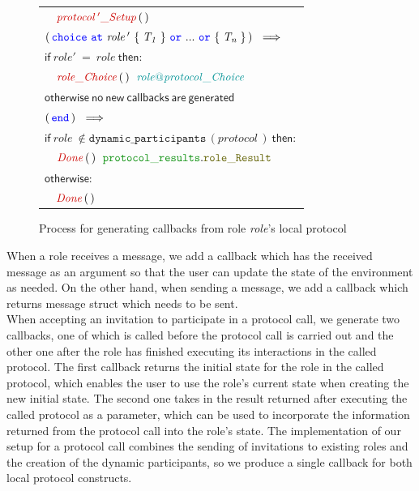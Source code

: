 \documentclass[12pt,twoside]{report}
\begin{document}
\begin{figure}[!h]
\begin{center}
\begin{tabular}{l}
            $\quad \functionname{protocol\,'\_Setup}\,(\,)$\\[15pt]

            $(\,\choice\ \at\ \mathit{role\,'}\ \{\;\mathit{T_1}\;\}\ \scror\ ...\ \scror\ \{\;\mathit{T_n}\;\}\,)\ \implies$\\[6pt]
            $\textsf{if}\ \mathit{role'\ =\ role}\ \textsf{then:}$\\[4pt]
            
            $\quad \functionname{role\_Choice}\,(\,)\;\ \enumtype{\localprotocol{role}{protocol}\_Choice}$\\[10pt]
            $\mathsf{otherwise\ no\ new\ callbacks\ are\ generated}$\\[15pt]

            $(\,\scrend\,)\ \implies$\\[3pt] 
            
            $\mathsf{if}\ \mathit{role}\ \notin \mathtt{dynamic\_participants\,}\mathit{(protocol\,)}\ \mathsf{then}:$\\[4pt]
            
            $\quad \functionname{Done}\,(\,)\;\ \pkgstructaccess{protocol\_results}{role\_Result}$\\[6pt]
            
            $\mathsf{otherwise:}$\\[4pt]
            
            $\quad \functionname{Done}\,(\,)$\\[15pt]

        \end{tabular}
    \end{center}
    \caption{Process for generating callbacks from role \textit{role}'s local protocol}
    \label{callbacks-gen}
\end{figure}

When a role receives a message, we add a callback which has the received message as an argument so that the user can update the state of the environment as needed. On the other hand, when sending a message, we add a callback which returns message struct which needs to be sent.\\

When accepting an invitation to participate in a protocol call, we generate two callbacks, one of which is called before the protocol call is carried out and the other one after the role has finished executing its interactions in the called protocol. The first callback returns the initial state for the role in the called protocol, which enables the user to use the role's current state when creating the new initial state. The second one takes in the result returned after executing the called protocol as a parameter, which can be used to incorporate the information returned from the protocol call into the role's state. The implementation of our setup for a protocol call combines the sending of invitations to existing roles and the creation of the dynamic participants, so we produce a single callback for both local protocol constructs.
\end{document}

